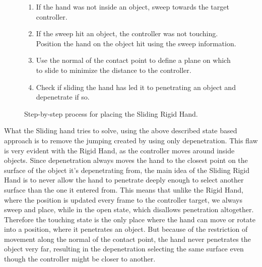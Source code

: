 \begin{figure}[H]
\begin{minipage}[t]{0.49\textwidth}
\begin{enumerate}[noitemsep]
\item If the hand was not inside an object, sweep towards the target controller.
\item If the sweep hit an object, the controller was not touching. Position the hand on the object hit using the sweep information.
\item Use the normal of the contact point to define a plane on which to slide to minimize the distance to the controller.
\item Check if sliding the hand has led it to penetrating an object and depenetrate if so.
\end{enumerate}
\end{minipage}
\caption{Step-by-step process for placing the Sliding Rigid Hand.}
\label{fig:stepByStepSlidingRigidHand}
\end{figure}


What the Sliding hand tries to solve, using the above described state based approach is to remove the jumping created by using only depenetration. This flaw is very evident with the Rigid Hand, as the controller moves around inside objects. Since depenetration always moves the hand to the closest point on the surface of the object it's depenetrating from, the main idea of the Sliding Rigid Hand is to never allow the hand to penetrate deeply enough to select another surface than the one it entered from. This means that unlike the Rigid Hand, where the position is updated every frame to the controller target, we always sweep and place, while in the open state, which disallows penetration altogether. Therefore the touching state is the only place where the hand can move or rotate into a position, where it penetrates an object. But because of the restriction of movement along the normal of the contact point, the hand never penetrates the object very far, resulting in the depenetration selecting the same surface even though the controller might be closer to another.

